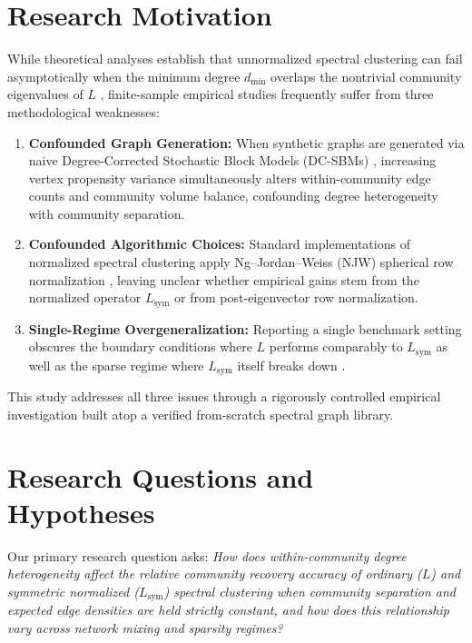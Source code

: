 \documentclass[10pt,twocolumn,a4paper]{article}
\begin{document}
\section{Research Motivation}
While theoretical analyses establish that unnormalized spectral clustering can fail asymptotically when the minimum degree $d_{\min}$ overlaps the nontrivial community eigenvalues of $L$ \cite{vonluxburg2008consistency}, finite-sample empirical studies frequently suffer from three methodological weaknesses:
\begin{enumerate}\setlength{\itemsep}{1pt}\setlength{\parskip}{0pt}
    \item \textbf{Confounded Graph Generation:} When synthetic graphs are generated via naive Degree-Corrected Stochastic Block Models (DC-SBMs) \cite{karrer2011stochastic}, increasing vertex propensity variance simultaneously alters within-community edge counts and community volume balance, confounding degree heterogeneity with community separation.
    \item \textbf{Confounded Algorithmic Choices:} Standard implementations of normalized spectral clustering apply Ng--Jordan--Weiss (NJW) spherical row normalization \cite{ng2001spectral}, leaving unclear whether empirical gains stem from the normalized operator $L_{\mathrm{sym}}$ or from post-eigenvector row normalization.
    \item \textbf{Single-Regime Overgeneralization:} Reporting a single benchmark setting obscures the boundary conditions where $L$ performs comparably to $L_{\mathrm{sym}}$ as well as the sparse regime where $L_{\mathrm{sym}}$ itself breaks down \cite{qin2013regularized}.
\end{enumerate}
This study addresses all three issues through a rigorously controlled empirical investigation built atop a verified from-scratch spectral graph library.

\section{Research Questions and Hypotheses}
Our primary research question asks: \emph{How does within-community degree heterogeneity affect the relative community recovery accuracy of ordinary ($L$) and symmetric normalized ($L_{\mathrm{sym}}$) spectral clustering when community separation and expected edge densities are held strictly constant, and how does this relationship vary across network mixing and sparsity regimes?}
\end{document}
